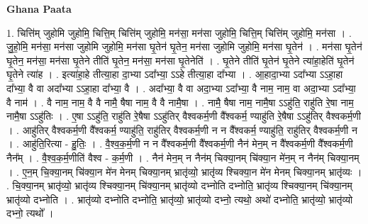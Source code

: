 \documentclass[17pt]{extarticle}
\begin{document}
\textbf{Ghana Paata } \newline

1. चित्ति॑म् जुहोमि जुहोमि॒ चित्ति॒म् चित्ति॑म् जुहोमि॒ मन॑सा॒ मन॑सा जुहोमि॒ चित्ति॒म् चित्ति॑म् जुहोमि॒ मन॑सा । . जु॒हो॒मि॒ मन॑सा॒ मन॑सा जुहोमि जुहोमि॒ मन॑सा घृ॒तेन॑ घृ॒तेन॒ मन॑सा जुहोमि जुहोमि॒ मन॑सा घृ॒तेन॑ । . मन॑सा घृ॒तेन॑ घृ॒तेन॒ मन॑सा॒ मन॑सा घृ॒तेने तीति॑ घृ॒तेन॒ मन॑सा॒ मन॑सा घृ॒तेनेति॑ । . घृ॒तेने तीति॑ घृ॒तेन॑ घृ॒तेने त्या॑हा॒हेति॑ घृ॒तेन॑ घृ॒तेने त्या॑ह । . इत्या॑हा॒हे तीत्या॒हा दा॒भ्या ऽदा᳚भ्या॒ ऽऽहे तीत्या॒हा दा᳚भ्या । . आ॒हादा॒भ्या ऽदा᳚भ्या ऽऽहा॒हा दा᳚भ्या॒ वै वा अदा᳚भ्या ऽऽहा॒हा दा᳚भ्या॒ वै । . अदा᳚भ्या॒ वै वा अदा॒भ्या ऽदा᳚भ्या॒ वै नाम॒ नाम॒ वा अदा॒भ्या ऽदा᳚भ्या॒ वै नाम॑ । . वै नाम॒ नाम॒ वै वै नामै॒ षैषा नाम॒ वै वै नामै॒षा । . नामै॒ षैषा नाम॒ नामै॒षा ऽऽहु॑ति॒ राहु॑ति रे॒षा नाम॒ नामै॒षा ऽऽहु॑तिः । . ए॒षा ऽऽहु॑ति॒ राहु॑ति रे॒षैषा ऽऽहु॑तिर् वैश्वकर्म॒णी वै᳚श्वकर्म॒ ण्याहु॑ति रे॒षैषा ऽऽहु॑तिर् वैश्वकर्म॒णी । . आहु॑तिर् वैश्वकर्म॒णी वै᳚श्वकर्म॒ ण्याहु॑ति॒ राहु॑तिर् वैश्वकर्म॒णी न न वै᳚श्वकर्म॒ ण्याहु॑ति॒ राहु॑तिर् वैश्वकर्म॒णी न । . आहु॑ति॒रित्या - हु॒तिः॒ । . वै॒श्व॒क॒र्म॒णी न न वै᳚श्वकर्म॒णी वै᳚श्वकर्म॒णी नैन॑ मेन॒म् न वै᳚श्वकर्म॒णी वै᳚श्वकर्म॒णी नैन᳚म् । . वै॒श्व॒क॒र्म॒णीति॑ वैश्व - क॒र्म॒णी । . नैन॑ मेन॒म् न नैन॑म् चिक्या॒नम् चि॑क्या॒न मे॑न॒म् न नैन॑म् चिक्या॒नम् । . ए॒न॒म् चि॒क्या॒नम् चि॑क्या॒न मे॑न मेनम् चिक्या॒नम् भ्रातृ॑व्यो॒ भ्रातृ॑व्य श्चिक्या॒न मे॑न मेनम् चिक्या॒नम् भ्रातृ॑व्यः । . चि॒क्या॒नम् भ्रातृ॑व्यो॒ भ्रातृ॑व्य श्चिक्या॒नम् चि॑क्या॒नम् भ्रातृ॑व्यो दभ्नोति दभ्नोति॒ भ्रातृ॑व्य श्चिक्या॒नम् चि॑क्या॒नम् भ्रातृ॑व्यो दभ्नोति । . भ्रातृ॑व्यो दभ्नोति दभ्नोति॒ भ्रातृ॑व्यो॒ भ्रातृ॑व्यो दभ्नो॒ त्यथो॒ अथो॑ दभ्नोति॒ भ्रातृ॑व्यो॒ भ्रातृ॑व्यो दभ्नो॒ त्यथो᳚ । \newline
\end{document}
